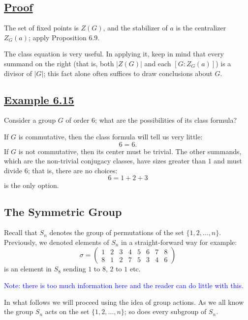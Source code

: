 \vspace{3em}

\subsection*{\underline{Proof}}
The set of fixed points is $Z(G)$, and the stabilizer of \underline{$a$} is the centralizer $Z_G(a)$; apply Proposition 6.9.


The class equation is very useful. In applying it, keep in mind that every summand on the right (that is, both $|Z(G)|$ and each $[G : Z_G(a)]$) is a divisor of $|G|$; this fact alone often suffices to draw conclusions about $G$.

\vspace{1.5em}

\subsection*{\underline{Example 6.15}}
Consider a group $G$ of order $6$; what are the possibilities of its class formula?

If $G$ is commutative, then the class formula will tell us very little:
\[
6 = 6.
\]
If $G$ is not commutative, then its center must be trivial. The other summands, which are the non-trivial conjugacy classes, have sizes greater than $1$ and must divide $6$; that is, there are no choices:
\[
6 = 1 + 2 + 3
\]
is the only option.
\subsection*{The Symmetric Group}

Recall that $S_n$ denotes the group of permutations of the set $\{1, 2, \dots, n\}$. Previously, we denoted elements of $S_n$ in a straight-forward way for example:
$$ \sigma = \begin{pmatrix} 1 & 2 & 3 & 4 & 5 & 6 & 7 & 8 \\ 8 & 1 & 2 & 7 & 5 & 3 & 4 & 6 \end{pmatrix} $$
is an element in $S_8$ sending $1$ to $8$, $2$ to $1$ etc.

\textcolor{blue}{Note: there is too much information here and the reader can do little with this.}

\vspace{1em}
In what follows we will proceed using the idea of group actions. As we all know the group $S_n$ acts on the set $\{1, 2, \dots, n\}$; so does every subgroup of $S_n$.

